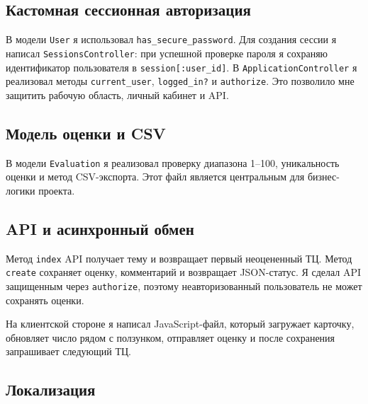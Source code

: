 \documentclass[14pt,a4paper]{extarticle}
\begin{document}
\subsection{Кастомная сессионная авторизация}

В модели \texttt{User} я использовал \texttt{has\_secure\_password}. Для создания сессии я написал \texttt{SessionsController}: при успешной проверке пароля я сохраняю идентификатор пользователя в \texttt{session[:user\_id]}. В \texttt{ApplicationController} я реализовал методы \texttt{current\_user}, \texttt{logged\_in?} и \texttt{authorize}. Это позволило мне защитить рабочую область, личный кабинет и API.



\subsection{Модель оценки и CSV}

В модели \texttt{Evaluation} я реализовал проверку диапазона 1--100, уникальность оценки и метод CSV-экспорта. Этот файл является центральным для бизнес-логики проекта.



\subsection{API и асинхронный обмен}

Метод \texttt{index} API получает тему и возвращает первый неоцененный ТЦ. Метод \texttt{create} сохраняет оценку, комментарий и возвращает JSON-статус. Я сделал API защищенным через \texttt{authorize}, поэтому неавторизованный пользователь не может сохранять оценки.



На клиентской стороне я написал JavaScript-файл, который загружает карточку, обновляет число рядом с ползунком, отправляет оценку и после сохранения запрашивает следующий ТЦ.



\subsection{Локализация}
\end{document}
